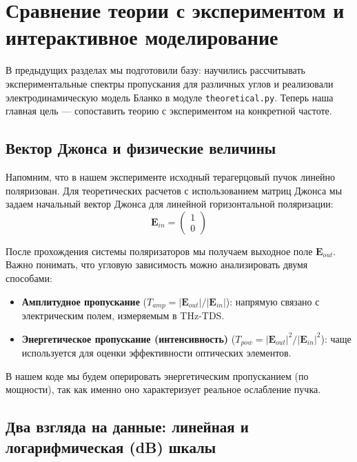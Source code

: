 
\section{Сравнение теории с экспериментом и интерактивное моделирование}

В предыдущих разделах мы подготовили базу: научились рассчитывать экспериментальные спектры пропускания для различных углов и реализовали электродинамическую модель Бланко в модуле \texttt{theoretical.py}. Теперь наша главная цель — сопоставить теорию с экспериментом на конкретной частоте.

\subsection{Вектор Джонса и физические величины}
Напомним, что в нашем эксперименте исходный терагерцовый пучок линейно поляризован. Для теоретических расчетов с использованием матриц Джонса мы задаем начальный вектор Джонса для линейной горизонтальной поляризации:
\begin{equation}
\mathbf{E}_{in} = \begin{pmatrix} 1 \\ 0 \end{pmatrix}
\end{equation}

После прохождения системы поляризаторов мы получаем выходное поле $\mathbf{E}_{out}$. Важно понимать, что угловую зависимость можно анализировать двумя способами:
\begin{itemize}
    \item \textbf{Амплитудное пропускание} ($T_{amp} = |\mathbf{E}_{out}| / |\mathbf{E}_{in}|$): напрямую связано с электрическим полем, измеряемым в THz-TDS.
    \item \textbf{Энергетическое пропускание (интенсивность)} ($T_{pow} = |\mathbf{E}_{out}|^2 / |\mathbf{E}_{in}|^2$): чаще используется для оценки эффективности оптических элементов.
\end{itemize}
В нашем коде мы будем оперировать энергетическим пропусканием (по мощности), так как именно оно характеризует реальное ослабление пучка.

\subsection{Два взгляда на данные: линейная и логарифмическая (dB) шкалы}

